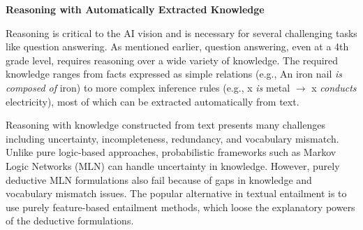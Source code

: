 \documentclass[a4paper,11pt,onecolumn]{article}
\begin{document}


{\bf Reasoning with Automatically Extracted Knowledge}

Reasoning is critical to the AI vision and is necessary for several challenging tasks like question answering. As mentioned earlier, question answering, even at a 4th grade level, requires reasoning over a wide variety of knowledge. The required knowledge ranges from facts expressed as simple relations (e.g., {An iron nail {\em is composed of} iron}) to more complex inference rules (e.g., x {\em is} metal $\rightarrow$ x {\em conducts} electricity), most of which can be extracted automatically from text. 
 
Reasoning with knowledge constructed from text presents many challenges including uncertainty, incompleteness, redundancy, and vocabulary mismatch. 
Unlike pure logic-based approaches, probabilistic frameworks such as Markov Logic Networks (MLN) can handle uncertainty in knowledge.
However, purely deductive MLN formulations also fail because of gaps in knowledge and vocabulary mismatch issues. The popular alternative in textual entailment is to use purely feature-based entailment methods, which loose the explanatory powers of the deductive formulations. 
\end{document}
